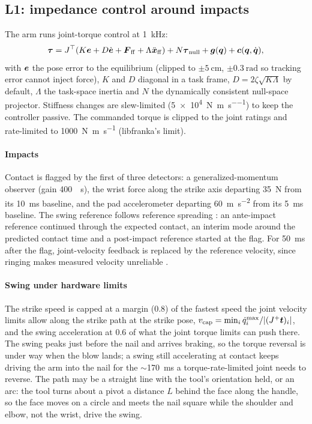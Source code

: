 \subsection{L1: impedance control around impacts}
\label{sec:l1}
The arm runs joint-torque control at \SI{1}{\kilo\hertz}:
\begin{equation}
  \boldsymbol{\tau} = J^\top\!\left(K\boldsymbol{e} + D\dot{\boldsymbol{e}} + \boldsymbol{F}_{\mathrm{ff}} + \Lambda\ddot{\boldsymbol{x}}_{\mathrm{ff}}\right)
  + N\boldsymbol{\tau}_{\mathrm{null}} + \boldsymbol{g}(\boldsymbol{q}) + \boldsymbol{c}(\boldsymbol{q},\dot{\boldsymbol{q}}),
\end{equation}
with $\boldsymbol{e}$ the pose error to the equilibrium (clipped to $\pm\SI{5}{\centi\metre}$, $\pm\SI{0.3}{\radian}$ so
tracking error cannot inject force), $K$ and $D$ diagonal in a task frame, $D=2\zeta\sqrt{K\Lambda}$ by default,
$\Lambda$ the task-space inertia and $N$ the dynamically consistent null-space projector. Stiffness changes are
slew-limited (\SI{5e4}{\newton\per\metre\per\second}) to keep the controller passive. The commanded torque is
clipped to the joint ratings and rate-limited to \SI{1000}{\newton\metre\per\second} (libfranka's limit).

\paragraph{Impacts} Contact is flagged by the first of three detectors: a generalized-momentum observer
\cite{haddadin2017collisions} (gain \SI{400}{\per\second}), the wrist force along the strike axis departing
\SI{35}{\newton} from its \SI{10}{\milli\second} baseline, and the pad accelerometer departing
\SI{60}{\metre\per\second\squared} from its \SI{5}{\milli\second} baseline. The swing reference follows reference
spreading \cite{vansteen2024rs}: an ante-impact reference continued through the expected contact, an interim mode
around the predicted contact time and a post-impact reference started at the flag. For \SI{50}{\milli\second} after
the flag, joint-velocity feedback is replaced by the reference velocity, since ringing makes measured velocity
unreliable \cite{vansteen2024simtoreal,yang2021impactinvariant}.

\paragraph{Swing under hardware limits} The strike speed is capped at a margin (0.8) of the fastest speed the joint
velocity limits allow along the strike path at the strike pose, $v_{\mathrm{cap}}=\min_i
\dot q_i^{\max}/|(J^{+}\boldsymbol{t})_i|$, and the swing acceleration at 0.6 of what the joint torque limits can push
there. The swing peaks just before the nail and arrives braking, so the torque reversal is under way when the blow
lands; a swing still accelerating at contact keeps driving the arm into the nail for the
$\sim$\SI{170}{\milli\second} a torque-rate-limited joint needs to reverse. The path may be a straight line with the
tool's orientation held, or an arc: the tool turns about a pivot a distance $L$ behind the face along the handle,
so the face moves on a circle and meets the nail square while the shoulder and elbow, not the wrist, drive the
swing.

